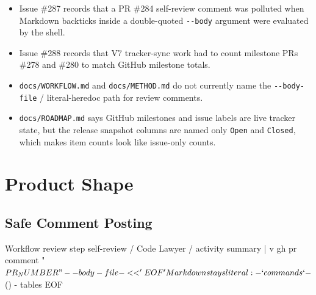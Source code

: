 \begin{itemize}
\tightlist
\item
  Issue \#287 records that a PR \#284 self-review comment was polluted when Markdown backticks inside a double-quoted \texttt{-\allowbreak{}-\allowbreak{}b\allowbreak{}o\allowbreak{}d\allowbreak{}y} argument were evaluated by the shell.
\item
  Issue \#288 records that V7 tracker-sync work had to count milestone PRs \#278 and \#280 to match GitHub milestone totals.
\item
  \texttt{d\allowbreak{}o\allowbreak{}c\allowbreak{}s\allowbreak{}/\allowbreak{}W\allowbreak{}O\allowbreak{}R\allowbreak{}K\allowbreak{}F\allowbreak{}L\allowbreak{}O\allowbreak{}W\allowbreak{}.\allowbreak{}m\allowbreak{}d} and \texttt{d\allowbreak{}o\allowbreak{}c\allowbreak{}s\allowbreak{}/\allowbreak{}M\allowbreak{}E\allowbreak{}T\allowbreak{}H\allowbreak{}O\allowbreak{}D\allowbreak{}.\allowbreak{}m\allowbreak{}d} do not currently name the \texttt{-\allowbreak{}-\allowbreak{}b\allowbreak{}o\allowbreak{}d\allowbreak{}y\allowbreak{}-\allowbreak{}f\allowbreak{}i\allowbreak{}l\allowbreak{}e} / literal-heredoc path for review comments.
\item
  \texttt{d\allowbreak{}o\allowbreak{}c\allowbreak{}s\allowbreak{}/\allowbreak{}R\allowbreak{}O\allowbreak{}A\allowbreak{}D\allowbreak{}M\allowbreak{}A\allowbreak{}P\allowbreak{}.\allowbreak{}m\allowbreak{}d} says GitHub milestones and issue labels are live tracker state, but the release snapshot columns are named only \texttt{O\allowbreak{}p\allowbreak{}e\allowbreak{}n} and \texttt{C\allowbreak{}l\allowbreak{}o\allowbreak{}s\allowbreak{}e\allowbreak{}d}, which makes item counts look like issue-only counts.
\end{itemize}

\section{Product Shape}\label{record-210-product-shape}

\subsection{Safe Comment Posting}\label{record-210-safe-comment-posting}

\begin{CodeBlock}
Workflow review step
  self-review / Code Lawyer / activity summary
    |
    v
  gh pr comment "$PR_NUMBER" --body-file - <<'EOF'
  Markdown stays literal:
  - `commands`
  - $()
  - tables
  EOF
\end{CodeBlock}

